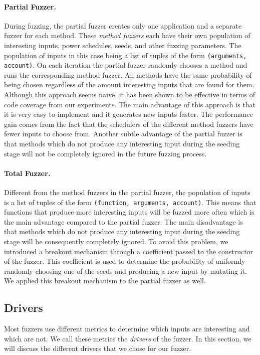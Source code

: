 \paragraph{Partial Fuzzer.} During fuzzing, the partial fuzzer creates only one application and a separate fuzzer for each method.
These \textit{method fuzzers} each have their own population of interesting inputs, power schedules, seeds, and other fuzzing parameters.
The population of inputs in this case being a list of tuples of the form \texttt{(arguments, account)}.
On each iteration the partial fuzzer randomly chooses a method and runs the corresponding method fuzzer.
All methods have the same probability of being chosen regardless of the amount interesting inputs that are found for them.
Although this approach seems naive, it has been shown to be effective in terms of code coverage from our experiments.
The main advantage of this approach is that it is very easy to implement and it generates new inputs faster.
The performance gain comes from the fact that the schedulers of the different method fuzzers have fewer inputs to choose from.
Another subtle advantage of the partial fuzzer is that methods which do not produce any interesting input during the seeding stage will not be completely ignored in the future fuzzing process.

\paragraph{Total Fuzzer.} Different from the method fuzzers in the partial fuzzer, the population of inputs is a list of tuples of the form \texttt{(function, arguments, account)}.
This means that functions that produce more interesting inputs will be fuzzed more often which is the main advantage compared to the partial fuzzer.
The main disadvantage is that methods which do not produce any interesting input during the seeding stage will be consequently completely ignored.
To avoid this problem, we introduced a breakout mechanism through a coefficient passed to the constructor of the fuzzer.
This coefficient is used to determine the probability of uniformly randomly choosing one of the seeds and producing a new input by mutating it.
We applied this breakout mechanism to the partial fuzzer as well.



\subsection*{Drivers}\label{section:drivers}
Most fuzzers use different metrics to determine which inputs are interesting and which are not.
We call these metrics the \textit{drivers} of the fuzzer.
In this section, we will discuss the different drivers that we chose for our fuzzer.


